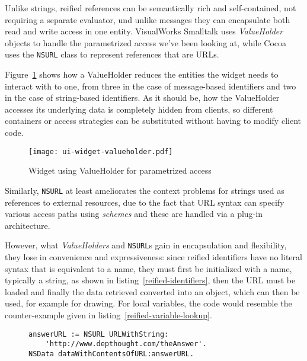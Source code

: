 \documentclass[preprint,authoryear]{acm_proc_article-sp}
\begin{document}
Unlike strings, reified references can be semantically rich and self-contained, not requiring
a separate evaluator, und unlike
messages they can encapsulate both read and write access in one entity.  VisualWorks 
Smalltalk uses {\em ValueHolder} objects to handle the parametrized access we've been
looking at, while Cocoa uses the {\tt NSURL} class to represent references that are URLs.

Figure~\ref{ui-widget-valueholder} shows how a ValueHolder reduces the entities the widget
needs to interact with to one, from three in the case of message-based identifiers and two
in the case of string-based identifiers.  As it should be, how the ValueHolder accesses 
its underlying data is completely hidden from clients, so different containers or access
strategies can be substituted without having to modify client code.

\begin{figure}[htbp]
\begin{center}
\texttt{[image: ui-widget-valueholder.pdf]}
\caption{Widget using ValueHolder for parametrized access}
\label{ui-widget-valueholder}
\end{center}
\end{figure}

Similarly, {\tt NSURL} at least ameliorates the context problems for strings used as
references to external resources, due to the fact that URL syntax can specify 
various access paths using {\em schemes} and these are handled via a plug-in 
architecture. 

However, what {\em ValueHolders} and {\tt NSURL}s gain in encapsulation and flexibility,
they lose in convenience and expressiveness:   since reified identifiers have no literal
syntax that is equivalent to a name, they must first be initialized with a name, typically
a string, as shown in listing~\ref{reified-identifiers}, then the URL must be loaded and
finally the data retrieved converted into an object, which can then be used, for example
for drawing.  For local variables, the code 
would resemble the counter-example given in listing~\ref{reified-variable-lookup}.


\begin{figure}[htbp]
\begin{lstlisting}[style=numbers,label=reified-identifiers,caption=Drawing an image stored on flickr.]
answerURL := NSURL URLWithString:
	'http://www.depthought.com/theAnswer'.
NSData dataWithContentsOfURL:answerURL.
\end{lstlisting}
\end{figure}
\end{document}
